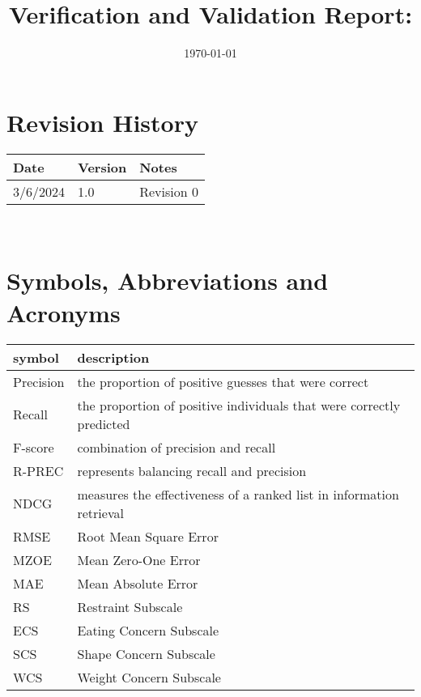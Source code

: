 \documentclass[12pt, titlepage]{article}
\begin{document}
\title{Verification and Validation Report: \progname} 
\author{\authname}
\date{\today}
	
\maketitle


\section{Revision History}

\begin{tabularx}{\textwidth}{p{3cm}p{2cm}X}
\toprule {\bf Date} & {\bf Version} & {\bf Notes}\\
\midrule
3/6/2024 & 1.0 & Revision 0\\
\bottomrule
\end{tabularx}

~\newpage

\section{Symbols, Abbreviations and Acronyms}

\renewcommand{\arraystretch}{1.2}
\begin{tabular}{l l} 
  \toprule		
  \textbf{symbol} & \textbf{description}\\
  \midrule 
  Precision & the proportion of positive guesses that were correct\\
  Recall & the proportion of positive individuals that were correctly predicted\\
  F-score & combination of precision and recall\\
  R-PREC & represents balancing recall and precision\\
  NDCG & measures the effectiveness of a ranked list in information retrieval\\
  RMSE & Root Mean Square Error\\
  MZOE & Mean Zero-One Error\\
  MAE & Mean Absolute Error\\
  RS & Restraint Subscale\\
  ECS & Eating Concern Subscale\\
  SCS & Shape Concern Subscale\\
  WCS & Weight Concern Subscale\\
  \bottomrule
\end{tabular}\\
\end{document}
